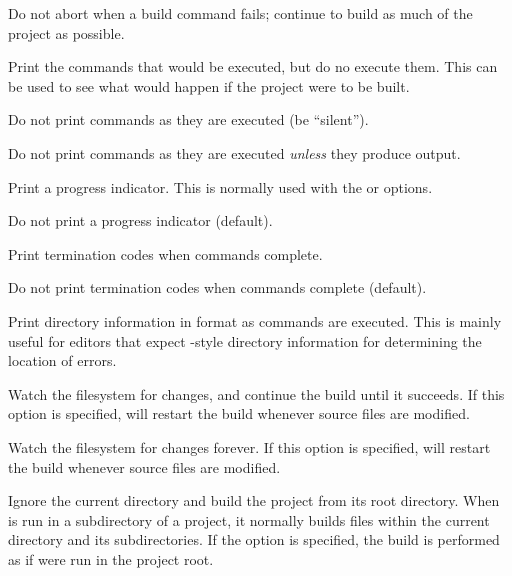 \begin{Description}\setlength{\itemsep}{0cm}
\item[\Opt{-k}] Do not abort when a build command fails;
continue to build as much of the project as possible.

\item[\Opt{-n}] Print the commands that would be executed, but do no execute them.
This can be used to see what would happen if the project were to be built.

\item[\Opt{-s}] Do not print commands as they are executed (be ``silent'').

\item[\Opt{-S}] Do not print commands as they are executed \emph{unless} they produce output.

\item[\Opt{--progress}] Print a progress indicator.
This is normally used with the  or  options.

\item[\Opt{--no-progress}] Do not print a progress indicator (default).

\item[\Opt{--print-exit}] Print termination codes when commands complete.

\item[\Opt{--no-print-exit}] Do not print termination codes when commands complete (default).

\item[\Opt{-w}] Print directory information in  format as commands are executed.
This is mainly useful for editors that expect -style
directory information for determining the location of errors.

\item[\Opt{-p}] Watch the filesystem for changes, and continue the build until it succeeds.  If this
option is specified,  will restart the build whenever source files are modified.

\item[\Opt{-P}] Watch the filesystem for changes forever.  If this option is specified, 
will restart the build whenever source files are modified.

\item[\Opt{-R}] Ignore the current directory and build the project from its root directory.  When
 is run in a subdirectory of a project, it normally builds files within the current
directory and its subdirectories.  If the  option is specified, the build is performed as if
 were run in the project root.


\end{Description}
